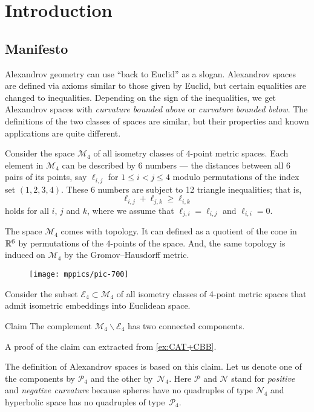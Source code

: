 \chapter{Introduction}

\section{Manifesto}

Alexandrov geometry can use ``back to Euclid'' as a slogan.
Alexandrov spaces are defined via axioms similar to those given by Euclid,
but certain  equalities are changed to inequalities. 
Depending on the sign of the inequalities, we get Alexandrov spaces with \emph{curvature bounded above} or \emph{curvature bounded below}.
The definitions of the two classes of spaces are similar, but their properties and known applications are quite different.


Consider the space $\mathcal{M}_4$ of all isometry classes of 4-point metric spaces.
Each element in $\mathcal{M}_4$ can be described by 6 numbers 
 --- the distances between all 6 pairs of its points, say $\ell_{i,j}$ for $1\le i< j\le 4$ modulo permutations of the index set $(1,2,3,4)$.
These 6 numbers are subject to 12 triangle inequalities; that is,
\[\ell_{i,j}+\ell_{j,k}\ge \ell_{i,k}\]
holds for all $i$, $j$ and $k$, where we assume that $\ell_{j,i}=\ell_{i,j}$ and $\ell_{i,i}=0$.

The space $\mathcal{M}_4$ comes with topology.
It can defined as a quotient of the cone in $\mathbb{R}^6$ by permutations of the 4-points of the space.
And, the same topology is induced on $\mathcal{M}_4$ by the Gromov--Hausdorff metric.

\begin{wrapfigure}[7]{o}{33mm}
\vskip-0mm
\centering
\texttt{[image: mppics/pic-700]}
\end{wrapfigure}

Consider the subset $\mathcal{E}_4\subset \mathcal{M}_4$ of all isometry classes of 4-point metric spaces that admit isometric embeddings into Euclidean space.

\begin{thm}{Claim}\label{clm:two-components-of-M4}
The complement $\mathcal{M}_4\backslash \mathcal{E}_4$ has two connected components.
\end{thm}

A proof of the claim can extracted from \ref{ex:CAT+CBB}.

The definition of Alexandrov spaces is based on this claim.
Let us denote one of the components by $\mathcal{P}_4$ and the other by~$\mathcal{N}_4$.
Here $\mathcal{P}$ and $\mathcal{N}$ stand for {}\emph{positive} 
and {}\emph{negative curvature} because spheres have no quadruples of type $\mathcal{N}_4$ and 
hyperbolic space
has no quadruples of type~$\mathcal{P}_4$.

